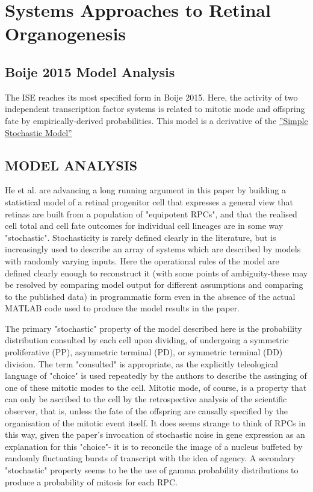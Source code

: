
\chapter{Systems Approaches to Retinal Organogenesis}

\section{Boije 2015 Model Analysis}

The ISE reaches its most specified form in Boije 2015. Here, the activity of two independent transcription factor systems is related to mitotic mode and offspring fate by empirically-derived probabilities. This model is a derivative of the \hyperref[SSM]{''Simple Stochastic Model''}












\section{MODEL ANALYSIS}

He et al. are advancing a long running argument in this paper by building a statistical model of a retinal progenitor cell that expresses a general view that retinas are built from a population of "equipotent RPCs", and that the realised cell total and cell fate outcomes for individual cell lineages are in some way "stochastic". Stochasticity is rarely defined clearly in the literature, but is increasingly used to describe an array of systems which are described by models with randomly varying inputs. Here the operational rules of the model are defined clearly enough to reconstruct it (with some points of ambiguity-these may be resolved by comparing model output for different assumptions and comparing to the published data) in programmatic form even in the absence of the actual MATLAB code used to produce the model results in the paper.

The primary "stochastic" property of the model described here is the probability distribution consulted by each cell upon dividing, of undergoing a symmetric proliferative (PP), asymmetric terminal (PD), or symmetric terminal (DD) division. The term "consulted" is appropriate, as the explicitly teleological language of "choice" is used repeatedly by the authors to describe the assinging of one of these mitotic modes to the cell. Mitotic mode, of course, is a property that can only be ascribed to the cell by the retrospective analysis of the scientific observer, that is, unless the fate of the offspring are causally specified by the organisation of the mitotic event itself. It does seems strange to think of RPCs in this way, given the paper's invocation of stochastic noise in gene expression as an explanation for this "choice"- it is to reconcile the image of a nucleus buffeted by randomly fluctuating bursts of transcript with the idea of agency. A secondary "stochastic" property seems to be the use of gamma probability distributions to produce a probability of mitosis for each RPC.

